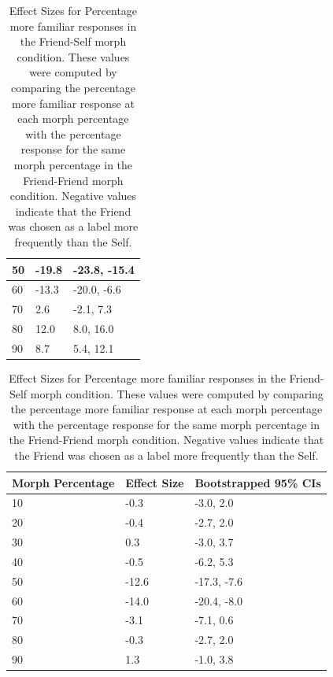 \documentclass[10pt,letterpaper]{article}
\begin{document}
\begin{table}[ht]
\begin{center}
\begin{tabular}{ | m{3.5cm} | m{5cm}| m{3.5cm} | }
\hline
50 & -19.8 & -23.8, -15.4 \\
\hline
60 & -13.3 & -20.0, -6.6 \\
\hline
70 & 2.6 & -2.1, 7.3 \\
\hline
80 & 12.0 & 8.0, 16.0 \\
\hline
90 & 8.7 & 5.4, 12.1 \\
\hline
\end{tabular}
\vspace{0.5cm} 
\caption{\color{Gray} Effect Sizes for Percentage more familiar responses in the Friend-Self morph condition. These values were computed by comparing the percentage more familiar response at each morph percentage with the percentage response for the same morph percentage in the Friend-Friend morph condition. Negative values indicate that the Friend was chosen as a label more frequently than the Self. }
\label{Table 7}
\centering
\begin{tabular}{ | m{3.5cm} | m{5cm}| m{3.5cm} | } 
\hline
\textbf{Morph Percentage} & \textbf{Effect Size} & \textbf{Bootstrapped 95\% CIs} \\ 
\hline
10 & -0.3 & -3.0, 2.0 \\
\hline
20 & -0.4 & -2.7, 2.0 \\
\hline
30 & 0.3 & -3.0, 3.7 \\
\hline
40 & -0.5 & -6.2, 5.3 \\
\hline
50 & -12.6 & -17.3, -7.6 \\
\hline
60 & -14.0 & -20.4, -8.0 \\
\hline
70 & -3.1 & -7.1, 0.6 \\
\hline
80 & -0.3 & -2.7, 2.0 \\
\hline
90 & 1.3 & -1.0, 3.8 \\
\hline
\end{tabular}
\end{center}
\end{table}
\end{document}
